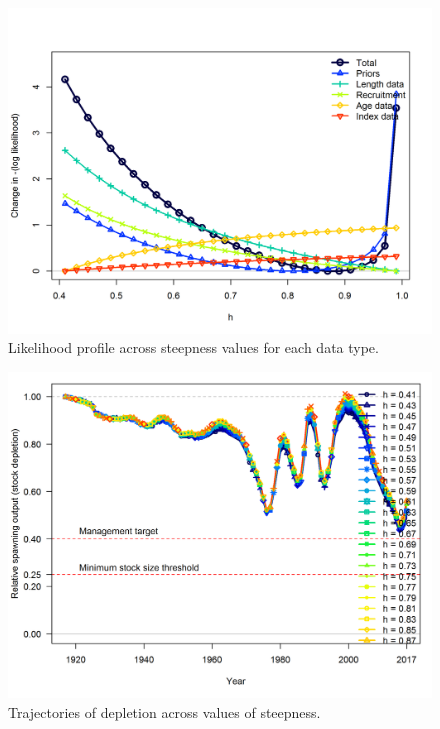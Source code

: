\documentclass[12pt,]{article}
\begin{document}
\begin{figure}[htbp]
\centering
\includegraphics{Figures/profile_h_like.png}
\caption{Likelihood profile across steepness values for each data type.
\label{fig:profile_h_like}}
\end{figure}

\begin{figure}[htbp]
\centering
\includegraphics{Figures/profile_h_depl.png}
\caption{Trajectories of depletion across values of steepness.
\label{fig:profile_h_depl}}
\end{figure}
\end{document}
